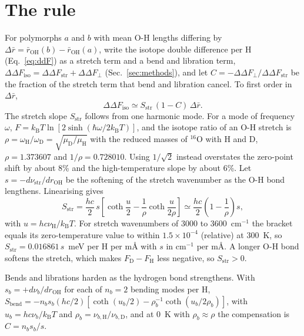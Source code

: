 \documentclass[aps,prmaterials,reprint,superscriptaddress,nofootinbib]{revtex4-2}
\newcommand{\ddF}{\Delta\Delta F_{\mathrm{iso}}}
\begin{document}
\section{The rule}
\label{sec:rule}

For polymorphs $a$ and $b$ with mean O-H lengths differing by $\Delta\bar r = \bar r_{\mathrm{OH}}(b) - \bar r_{\mathrm{OH}}(a)$, write the isotope double difference per H (Eq.~\eqref{eq:ddF}) as a stretch term and a bend and libration term, $\ddF = \Delta\Delta F_{\mathrm{str}} + \Delta\Delta F_{\perp}$ (Sec.~\ref{sec:methods}), and let $C = -\Delta\Delta F_{\perp}/\Delta\Delta F_{\mathrm{str}}$ be the fraction of the stretch term that bend and libration cancel. To first order in $\Delta\bar r$,
\begin{equation}
\ddF \simeq S_{\mathrm{str}}\,(1 - C)\,\Delta\bar r .
\label{eq:rule}
\end{equation}
The stretch slope $S_{\mathrm{str}}$ follows from one harmonic mode. For a mode of frequency $\omega$, $F = k_{\mathrm{B}}T\ln[2\sinh(\hbar\omega/2k_{\mathrm{B}}T)]$, and the isotope ratio of an O-H stretch is $\rho = \omega_{\mathrm{H}}/\omega_{\mathrm{D}} = \sqrt{\mu_{\mathrm{D}}/\mu_{\mathrm{H}}}$ with the reduced masses of $^{16}$O with H and D, $\rho = 1.373607$ and $1/\rho = 0.728010$. Using $1/\sqrt{2}$ instead overstates the zero-point shift by about 8\% and the high-temperature slope by about 6\%. Let $s = -d\nu_{\mathrm{str}}/dr_{\mathrm{OH}}$ be the softening of the stretch wavenumber as the O-H bond lengthens. Linearising gives
\begin{equation}
S_{\mathrm{str}} = \frac{hc}{2}\,s\left[\coth\frac{u}{2} - \frac{1}{\rho}\coth\frac{u}{2\rho}\right] \simeq \frac{hc}{2}\left(1 - \frac{1}{\rho}\right)s ,
\label{eq:Sstr}
\end{equation}
with $u = hc\nu_{\mathrm{H}}/k_{\mathrm{B}}T$. For stretch wavenumbers of 3000 to 3600~cm$^{-1}$ the bracket equals its zero-temperature value to within $1.5\times10^{-4}$ (relative) at 300~K, so $S_{\mathrm{str}} = 0.016861\,s$~meV per H per m\AA{} with $s$ in cm$^{-1}$ per m\AA. A longer O-H bond softens the stretch, which makes $F_{\mathrm{D}} - F_{\mathrm{H}}$ less negative, so $S_{\mathrm{str}}>0$.

Bends and librations harden as the hydrogen bond strengthens. With $s_b = +d\nu_b/dr_{\mathrm{OH}}$ for each of $n_b = 2$ bending modes per H, $S_{\mathrm{bend}} = -n_b s_b (hc/2)[\coth(u_b/2) - \rho_b^{-1}\coth(u_b/2\rho_b)]$, with $u_b = hc\nu_b/k_{\mathrm{B}}T$ and $\rho_b = \nu_{b,\mathrm{H}}/\nu_{b,\mathrm{D}}$, and at 0~K with $\rho_b \approx \rho$ the compensation is $C = n_b s_b/s$.
\end{document}
